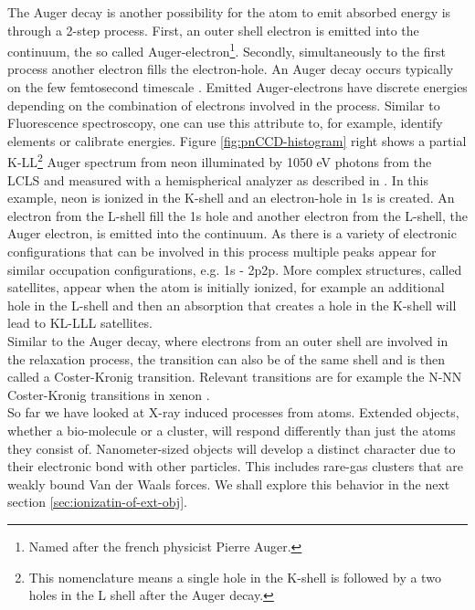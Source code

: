 The Auger decay is another possibility for the atom to emit absorbed energy is through a 2-step process. First, an outer shell electron is emitted into the continuum, the so called Auger-electron\footnote{Named after the french physicist Pierre Auger.}. Secondly, simultaneously to the first process another electron fills the electron-hole. An Auger decay occurs typically on the few femtosecond timescale \citep{Krause-1970-PhysLettA}. Emitted Auger-electrons have discrete energies depending on the combination of electrons involved in the process. Similar to Fluorescence spectroscopy, one can use this attribute to, for example, identify elements or calibrate energies. Figure \ref{fig:pnCCD-histogram} right shows a partial K-LL\footnote{This nomenclature means a single hole in the K-shell is followed by a two holes in the L shell after the Auger decay.} Auger spectrum from neon illuminated by 1050 eV photons from the LCLS and measured with a hemispherical analyzer as described in \citep{Bucher-2014-Unpublished}. In this example, neon is ionized in the K-shell and an electron-hole in 1s is created. An electron from the L-shell fill the 1s hole and another electron from the L-shell, the Auger electron, is emitted into the continuum. As there is a variety of electronic configurations that can be involved in this process multiple peaks appear for similar occupation configurations, e.g. 1s - 2p2p. More complex structures, called satellites, appear when the atom is initially ionized, for example an additional hole in the L-shell and then an absorption that creates a hole in the K-shell will lead to KL-LLL satellites.\\
Similar to the Auger decay, where electrons from an outer shell are involved in the relaxation process, the transition can also be of the same shell and is then called a Coster-Kronig transition. Relevant transitions are for example the N-NN Coster-Kronig transitions in xenon \citep{Coster-1935-Physica}.
\\
So far we have looked at X-ray induced processes from atoms. Extended objects, whether a bio-molecule or a cluster, will respond differently than just the atoms they consist of. Nanometer-sized objects will develop a distinct character due to their electronic bond with other particles. This includes rare-gas clusters that are weakly bound Van der Waals forces. We shall explore this behavior in the next section \ref{sec:ionizatin-of-ext-obj}.
%
%
%
%
